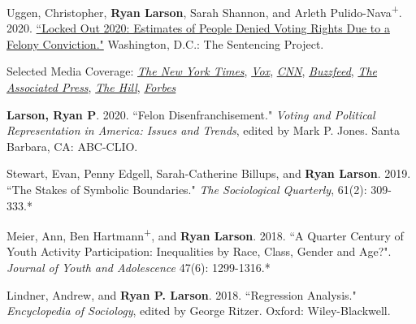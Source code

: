 \documentclass[letterpaper]{article}
\renewenvironment{itemize}{
  \begin{list}{}{
    \setlength{\leftmargin}{1.5em}
  }
}{
  \end{list}
}
\begin{document}
\begin{itemize}
\item Uggen, Christopher, \textbf{Ryan Larson}, Sarah Shannon, and Arleth Pulido-Nava\textsuperscript{+}. 2020. \href{https://www.sentencingproject.org/publications/locked-out-2020-estimates-of-people-denied-voting-rights-due-to-a-felony-conviction/}{``Locked Out 2020: Estimates of People Denied Voting Rights Due to a Felony Conviction."} Washington, D.C.: The Sentencing Project.
\begin{itemize}
\item Selected Media Coverage: \href{https://www.nytimes.com/live/2020/10/18/us/trump-vs-biden}{\textit{The New York Times}}, \href{https://www.vox.com/2020/10/14/21515850/voting-rights-sentencing-project-felon-disenfranchisement}{\textit{Vox}}, \href{https://www.cnn.com/2020/10/15/us/felony-convictions-voting-sentencing-project-study/index.html}{\textit{CNN}}, \href{https://www.buzzfeednews.com/article/skbaer/millions-cant-vote-2020-election-felony-convictions}{\textit{Buzzfeed}},  \href{https://apnews.com/article/election-2020-race-and-ethnicity-voting-rights-elections-tennessee-1467837105617bfd351b7b9969dc1683}{\textit{The Associated Press}}, \href{https://thehill.com/opinion/campaign/527510-thousands-of-people-with-felony-convictions-wont-be-able-to-vote-in-ga-run}{\textit{The Hill}}, \href{https://www.forbes.com/sites/joewalsh/2020/10/14/over-5-million-americans-wont-be-able-to-vote-next-month-because-of-criminal-records/?sh=3d0984982fc5}{\textit{Forbes}}
\end{itemize}

\item \textbf{Larson, Ryan P}. 2020. ``Felon Disenfranchisement." \textit{Voting and Political Representation in America: Issues and Trends}, edited by Mark P. Jones. Santa Barbara, CA: ABC-CLIO.

\item Stewart, Evan, Penny Edgell, Sarah-Catherine Billups, and \textbf{Ryan Larson}. 2019. ``The Stakes of Symbolic Boundaries."  \textit{The Sociological Quarterly}, 61(2): 309-333.*

\item Meier, Ann, Ben Hartmann\textsuperscript{+}, and \textbf{Ryan Larson}. 2018.  ``A Quarter Century of Youth Activity Participation: Inequalities by Race, Class, Gender and Age?". \textit{Journal of Youth and Adolescence} 47(6): 1299-1316.*

\item Lindner, Andrew, and \textbf{Ryan P. Larson}. 2018. ``Regression Analysis." \textit{Encyclopedia of Sociology}, edited by George Ritzer. Oxford: Wiley-Blackwell.


\end{itemize}
\end{document}
